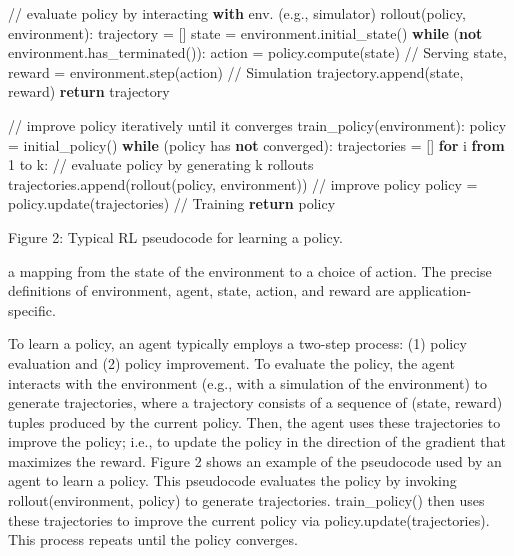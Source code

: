 \documentclass[
]{article}
\newenvironment{Shaded}{}{}
\newcommand{\ControlFlowTok}[1]{\textcolor[rgb]{0.00,0.44,0.13}{\textbf{#1}}}
\newcommand{\DecValTok}[1]{\textcolor[rgb]{0.25,0.63,0.44}{#1}}
\newcommand{\ImportTok}[1]{\textcolor[rgb]{0.00,0.50,0.00}{\textbf{#1}}}
\newcommand{\KeywordTok}[1]{\textcolor[rgb]{0.00,0.44,0.13}{\textbf{#1}}}
\newcommand{\NormalTok}[1]{#1}
\newcommand{\OperatorTok}[1]{\textcolor[rgb]{0.40,0.40,0.40}{#1}}
\begin{document}
\begin{Shaded}
\begin{Highlighting}[]
\OperatorTok{//}\NormalTok{ evaluate policy by interacting }\ControlFlowTok{with}\NormalTok{ env. (e.g., simulator)}
\NormalTok{rollout(policy, environment):}
\NormalTok{trajectory }\OperatorTok{=}\NormalTok{ []}
\NormalTok{state }\OperatorTok{=}\NormalTok{ environment.initial\_state()}
\ControlFlowTok{while}\NormalTok{ (}\KeywordTok{not}\NormalTok{ environment.has\_terminated()):}
\NormalTok{    action }\OperatorTok{=}\NormalTok{ policy.compute(state) }\OperatorTok{//}\NormalTok{ Serving}
\NormalTok{    state, reward }\OperatorTok{=}\NormalTok{ environment.step(action) }\OperatorTok{//}\NormalTok{ Simulation}
\NormalTok{    trajectory.append(state, reward)}
\ControlFlowTok{return}\NormalTok{ trajectory }
\end{Highlighting}
\end{Shaded}

\begin{Shaded}
\begin{Highlighting}[]
\OperatorTok{//}\NormalTok{ improve policy iteratively until it converges}
\NormalTok{train\_policy(environment):}
\NormalTok{    policy }\OperatorTok{=}\NormalTok{ initial\_policy()}
    \ControlFlowTok{while}\NormalTok{ (policy has }\KeywordTok{not}\NormalTok{ converged):}
\NormalTok{    trajectories }\OperatorTok{=}\NormalTok{ []}
    \ControlFlowTok{for}\NormalTok{ i }\ImportTok{from} \DecValTok{1}\NormalTok{ to k:}
    \OperatorTok{//}\NormalTok{ evaluate policy by generating k rollouts}
\NormalTok{    trajectories.append(rollout(policy, environment))}
    \OperatorTok{//}\NormalTok{ improve policy}
\NormalTok{    policy }\OperatorTok{=}\NormalTok{ policy.update(trajectories) }\OperatorTok{//}\NormalTok{ Training}
\ControlFlowTok{return}\NormalTok{ policy }
\end{Highlighting}
\end{Shaded}

Figure 2: Typical RL pseudocode for learning a policy.

a mapping from the state of the environment to a choice of action. The
precise definitions of environment, agent, state, action, and reward are
application-specific.

To learn a policy, an agent typically employs a two-step process: (1)
policy evaluation and (2) policy improvement. To evaluate the policy,
the agent interacts with the environment (e.g., with a simulation of the
environment) to generate trajectories, where a trajectory consists of a
sequence of (state, reward) tuples produced by the current policy. Then,
the agent uses these trajectories to improve the policy; i.e., to update
the policy in the direction of the gradient that maximizes the reward.
Figure 2 shows an example of the pseudocode used by an agent to learn a
policy. This pseudocode evaluates the policy by invoking
rollout(environment, policy) to generate trajectories. train\_policy()
then uses these trajectories to improve the current policy via
policy.update(trajectories). This process repeats until the policy
converges.
\end{document}
